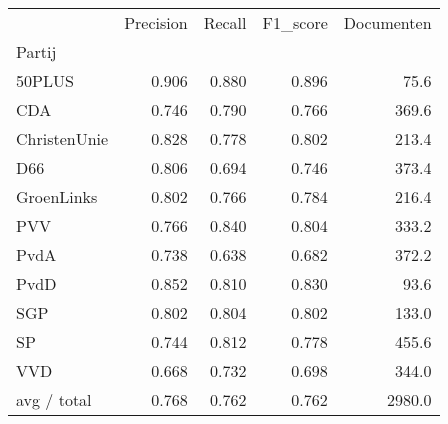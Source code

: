 \begin{tabular}{lrrrr}
\toprule
{} &  Precision &  Recall &  F1\_score &  Documenten \\
Partij       &            &         &           &             \\
\midrule
50PLUS       &      0.906 &   0.880 &     0.896 &        75.6 \\
   CDA       &      0.746 &   0.790 &     0.766 &       369.6 \\
ChristenUnie &      0.828 &   0.778 &     0.802 &       213.4 \\
   D66       &      0.806 &   0.694 &     0.746 &       373.4 \\
  GroenLinks &      0.802 &   0.766 &     0.784 &       216.4 \\
   PVV       &      0.766 &   0.840 &     0.804 &       333.2 \\
  PvdA       &      0.738 &   0.638 &     0.682 &       372.2 \\
  PvdD       &      0.852 &   0.810 &     0.830 &        93.6 \\
   SGP       &      0.802 &   0.804 &     0.802 &       133.0 \\
    SP       &      0.744 &   0.812 &     0.778 &       455.6 \\
   VVD       &      0.668 &   0.732 &     0.698 &       344.0 \\
 avg / total &      0.768 &   0.762 &     0.762 &      2980.0 \\
\bottomrule
\end{tabular}
